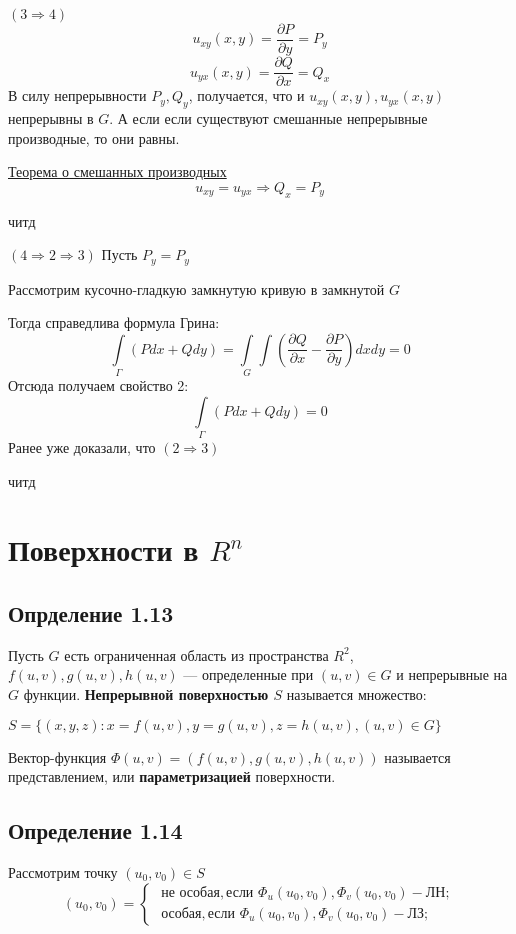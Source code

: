 \documentclass{article}
\begin{document}
$(3 \Rightarrow 4)$
$$
u_{xy}(x,y) = \frac{\partial P}{\partial y} = P_y
$$
$$
u_{yx}(x,y) = \frac{\partial Q}{\partial x} = Q_x
$$
В силу непрерывности $P_y , Q_y$, получается, что и
$u_{xy}(x,y), u_{yx}(x,y)$ непрерывны в $G$. А если если существуют смешанные непрерывные производные, то они равны.

\hyperref[eq6]{Теорема о смешанных производных}
$$
u_{xy} = u_{yx} \Rightarrow Q_x = P_y
$$

читд

$(4 \Rightarrow 2  \Rightarrow 3)$
	Пусть $P_y = P_y$

Рассмотрим кусочно-гладкую замкнутую кривую в замкнутой $G$

Тогда справедлива формула Грина:
$$
\int\limits_{\Gamma} (Pdx + Qdy)
=
\int\limits_{G} \int (\frac{\partial Q}{\partial x} 
- 
\frac{\partial P}{\partial y}) dxdy
=
0
$$
Отсюда получаем свойство 2:
$$
\int\limits_{\Gamma} (Pdx + Qdy)
=
0
$$
Ранее уже доказали, что $(2 \Rightarrow 3)$

читд

\section*{Поверхности в $R^n$}
\subsection*{Опрделение 1.13 }

Пусть $G$ есть ограниченная область из пространства $R^2$,
$f(u, v),g(u, v), h(u, v)$ — определенные при $(u, v) \in G$ и непрерывные
на $G$ функции. \textbf{Непрерывной поверхностью $S$} называется множество:

$
S = \{(x, y, z) : x = f(u, v), y = g(u, v), z = h(u, v), (u, v) \in G \}
$

Вектор-функция $\Phi(u, v)= (f(u, v), g(u, v), h(u, v))$ называется
представлением, или \textbf{параметризацией} поверхности.	
	
\subsection*{Определение 1.14 }
	
Рассмотрим точку $(u_0 , v_0) \in S$
$$
(u_0 , v_0) = \begin{cases}
	\textbf{ не особая}, \text{если }  \Phi_u(u_0 , v_0), \Phi_v(u_0 , v_0) - \text{ЛН};\\
	\textbf{ особая}, \text{если } \Phi_u(u_0 , v_0) , \Phi_v(u_0 , v_0) - \text{ЛЗ};
\end{cases}
$$
\end{document}
